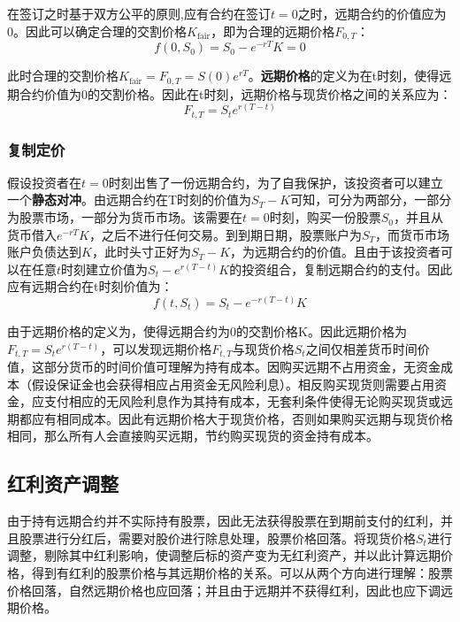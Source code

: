 \documentclass[11pt]{article}
\begin{document}
在签订之时基于双方公平的原则,应有合约在签订$t=0$之时，远期合约的价值应为0。因此可以确定合理的交割价格$K_{\text{fair}}$，即为合理的远期价格$F_{0,T}$：
\begin{equation*}
    f(0,S_0) = S_0 - e^{-rT}K = 0
\end{equation*}

此时合理的交割价格$K_{\text{fair}} = F_{0,T} = S(0) e^{rT}$。\textbf{远期价格}的定义为在t时刻，使得远期合约价值为0的交割价格。因此在t时刻，远期价格与现货价格之间的关系应为：
\begin{equation*}
    \boxed{
        F_{t,T} = S_t e^{r(T-t)}
    }
\end{equation*}

\subsubsection{复制定价}

假设投资者在$t=0$时刻出售了一份远期合约，为了自我保护，该投资者可以建立一个\textbf{静态对冲}。由远期合约在T时刻的价值为$S_T - K$可知，可分为两部分，一部分为股票市场，一部分为货币市场。该需要在$t=0$时刻，购买一份股票$S_0$，并且从货币借入$e^{-rT}K$，之后不进行任何交易。到到期日期，股票账户为$S_T$，而货币市场账户负债达到$K$，此时头寸正好为$S_T-K$，为远期合约的价值。且由于该投资者可以在任意$t$时刻建立价值为$S_t - e^{r(T-t)}K$的投资组合，复制远期合约的支付。因此应有远期合约在t时刻价值为：
\begin{equation*}
        f(t,S_t) =  S_t - e^{-r(T-t)} K
\end{equation*}

由于远期价格的定义为，使得远期合约为0的交割价格K。因此远期价格为$F_{t,T} = S_t e^{r(T-t)}$，可以发现远期价格$F_{t,T}$与现货价格$S_t$之间仅相差货币时间价值，这部分货币的时间价值可理解为持有成本。因购买远期不占用资金，无资金成本（假设保证金也会获得相应占用资金无风险利息）。相反购买现货则需要占用资金，应支付相应的无风险利息作为其持有成本，无套利条件使得无论购买现货或远期都应有相同成本。因此有远期价格大于现货价格，否则如果购买远期与现货价格相同，那么所有人会直接购买远期，节约购买现货的资金持有成本。

\subsection{红利资产调整}

由于持有远期合约并不实际持有股票，因此无法获得股票在到期前支付的红利，并且股票进行分红后，需要对股价进行除息处理，股票价格回落。将现货价格$S_t$进行调整，剔除其中红利影响，使调整后标的资产变为无红利资产，并以此计算远期价格，得到有红利的股票价格与其远期价格的关系。可以从两个方向进行理解：股票价格回落，自然远期价格也应回落；并且由于远期并不获得红利，因此也应下调远期价格。
\end{document}
